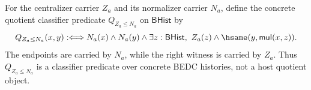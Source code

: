 \begin{definition}
\label{def:centralizer-normalizer-quotient-classifier}
For the centralizer carrier $Z_a$ and its normalizer carrier $N_a$, define
the concrete quotient classifier predicate $Q_{Z_a\leq N_a}$ on
$\mathsf{BHist}$ by
$$
Q_{Z_a\leq N_a}(x,y)
:\Longleftrightarrow
N_a(x)\land N_a(y)\land
\exists z:\mathsf{BHist},\ Z_a(z)\land
\hsame(y,\mathsf{mul}(x,z)).
$$
The endpoints are carried by $N_a$, while the right witness is carried by
$Z_a$. Thus $Q_{Z_a\leq N_a}$ is a classifier predicate over concrete BEDC
histories, not a host quotient object.
\end{definition}

